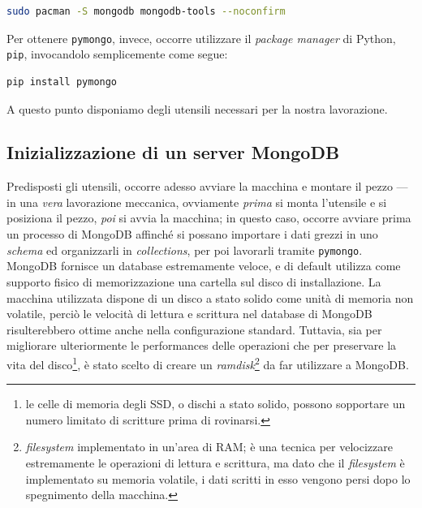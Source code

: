 		\begin{lstlisting}[language=bash,caption={installazione di MongoDB}]
			sudo pacman -S mongodb mongodb-tools --noconfirm
		\end{lstlisting}

		\vspace{0.3cm}

		Per ottenere \texttt{pymongo}, invece, occorre utilizzare il \textit{package manager} di Python, \texttt{pip}, invocandolo semplicemente come segue:

		\begin{lstlisting}[language=bash,caption={installazione di pymongo}]
			pip install pymongo
		\end{lstlisting}

		\vspace{0.3cm}

		A questo punto disponiamo degli utensili necessari per la nostra lavorazione.

	\subsection{Inizializzazione di un server MongoDB}

		Predisposti gli utensili, occorre adesso avviare la macchina e montare il pezzo --- in una \textit{vera} lavorazione meccanica, ovviamente \textit{prima} si monta l'utensile e si posiziona il pezzo, \textit{poi} si avvia la macchina; in questo caso, occorre avviare prima un processo di MongoDB affinché si possano importare i dati grezzi in uno \textit{schema} ed organizzarli in \textit{collections}, per poi lavorarli tramite \texttt{pymongo}. \\

		MongoDB fornisce un database estremamente veloce, e di default utilizza come supporto fisico di memorizzazione una cartella sul disco di installazione. La macchina utilizzata dispone di un disco a stato solido come unità di memoria non volatile, perciò le velocità di lettura e scrittura nel database di MongoDB risulterebbero ottime anche nella configurazione standard. Tuttavia, sia per migliorare ulteriormente le performances delle operazioni che per preservare la vita del disco\footnote{le celle di memoria degli SSD, o dischi a stato solido, possono sopportare un numero limitato di scritture prima di rovinarsi.}, è stato scelto di creare un \textit{ramdisk}\footnote{\textit{filesystem} implementato in un'area di RAM; è una tecnica per velocizzare estremamente le operazioni di lettura e scrittura, ma dato che il \textit{filesystem} è implementato su memoria volatile, i dati scritti in esso vengono persi dopo lo spegnimento della macchina.} da far utilizzare a MongoDB. \\

